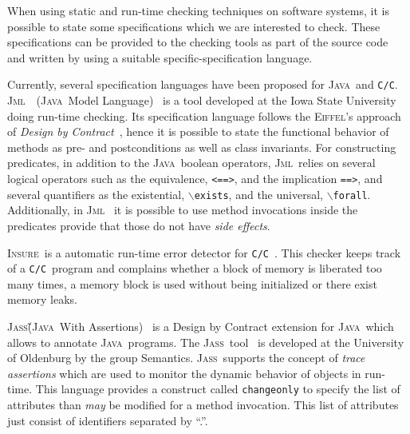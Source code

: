 \documentclass[a4paper]{llncs}
\newcommand{\jml}{\textsc{Jml}}
\newcommand{\jass}{\textsc{Jass}}
\newcommand{\java}{\textsc{Java}}
\newcommand{\cPP}{\texttt{C/C}\nolinebreak\hspace{-.05em}\raisebox{.4ex}{\tiny\bf
+}\nolinebreak\hspace{-.10em}\raisebox{.4ex}{\tiny\bf +}}
\newcommand{\eiff}{\textsc{Eiffel}}
\newcommand{\insPP}{\textsc{Insure\nolinebreak\hspace{-.05em}\raisebox{.4ex}{\tiny\bf
+}\nolinebreak\hspace{-.10em}\raisebox{.4ex}{\tiny\bf +}}}
\begin{document}
When using static and run-time checking techniques on software systems,
it is possible to state
some specifications which we are interested to check. These
specifications can be provided to the checking tools as part of the
source code and written by using a suitable
specific-specification language. 

Currently, several specification languages have been proposed
for \java~and \cPP. \jml~\ (\java~Model
Language)~\cite{LeavensBR00} is a tool developed at the Iowa State
University
doing run-time checking. Its specification language follows the
\eiff's approach of \emph{Design by
Contract}~\cite{Meyer97}, hence
it is possible to state the functional behavior of methods as
pre- and postconditions as well as class
invariants. For
constructing predicates, in addition to the \java~boolean operators, 
\jml~relies on several logical operators such as the equivalence,
\texttt{<==>}, and the implication \texttt{==>}, and several
quantifiers as the existential,
\texttt{$\backslash$exists}, and the universal, \texttt{$\backslash$forall}.
Additionally, in \jml~ it is possible to use method
invocations inside the predicates provide that
those do not have \emph{side effects}.

\insPP~is a automatic run-time error detector for
\cPP~\cite{InsurePP}. This checker keeps track of a \cPP~program and
complains whether a block of memory is liberated too many times, a memory
block is used without being initialized or there exist memory leaks.

\jass\~ (\java~With Assertions)~\cite{bartetzko01assertions} is a Design
by Contract extension for \java~which allows to annotate
\java~programs. The \jass~tool~\cite{JassUrl} is developed at the
University of Oldenburg by the group Semantics. \jass~supports the
concept of \emph{trace assertions} which are used to monitor the
dynamic behavior of objects in run-time. This language provides a
construct called \texttt{changeonly} to specify the list of
attributes than \emph{may} be modified for a method invocation. This
list of attributes just consist of identifiers separated by ``.''.
\end{document}
